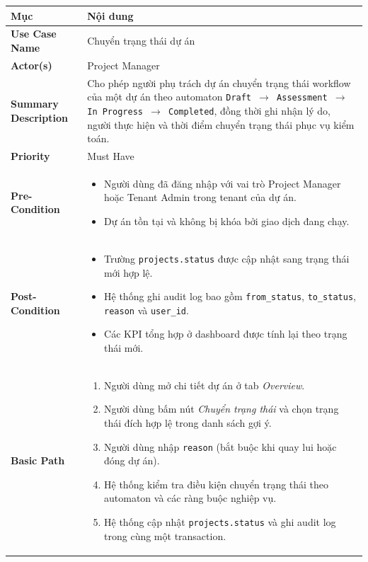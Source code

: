 \begin{xltabular}{\textwidth}{|>{\bfseries}p{4.5cm}|X|}
    \hline
    \textbf{Mục} & \textbf{Nội dung} \\
    \hline
    Use Case Name & Chuyển trạng thái dự án \\
    \hline
    Actor(s) & Project Manager \\
    \hline
    Summary Description & Cho phép người phụ trách dự án chuyển trạng thái workflow của một dự án theo automaton \texttt{Draft $\rightarrow$ Assessment $\rightarrow$ In Progress $\rightarrow$ Completed}, đồng thời ghi nhận lý do, người thực hiện và thời điểm chuyển trạng thái phục vụ kiểm toán. \\
    \hline
    Priority & Must Have \\
    \hline
    Pre-Condition &
    \begin{itemize}[leftmargin=*, nosep]
        \item Người dùng đã đăng nhập với vai trò Project Manager hoặc Tenant Admin trong tenant của dự án.
        \item Dự án tồn tại và không bị khóa bởi giao dịch đang chạy.
    \end{itemize} \\
    \hline
    Post-Condition &
    \begin{itemize}[leftmargin=*, nosep]
        \item Trường \texttt{projects.status} được cập nhật sang trạng thái mới hợp lệ.
        \item Hệ thống ghi audit log bao gồm \texttt{from\_status}, \texttt{to\_status}, \texttt{reason} và \texttt{user\_id}.
        \item Các KPI tổng hợp ở dashboard được tính lại theo trạng thái mới.
    \end{itemize} \\
    \hline
    Basic Path &
    \begin{enumerate}[leftmargin=*, nosep]
        \item Người dùng mở chi tiết dự án ở tab \emph{Overview}.
        \item Người dùng bấm nút \emph{Chuyển trạng thái} và chọn trạng thái đích hợp lệ trong danh sách gợi ý.
        \item Người dùng nhập \texttt{reason} (bắt buộc khi quay lui hoặc đóng dự án).
        \item Hệ thống kiểm tra điều kiện chuyển trạng thái theo automaton và các ràng buộc nghiệp vụ.
        \item Hệ thống cập nhật \texttt{projects.status} và ghi audit log trong cùng một transaction.

\end{enumerate}
\end{xltabular}
